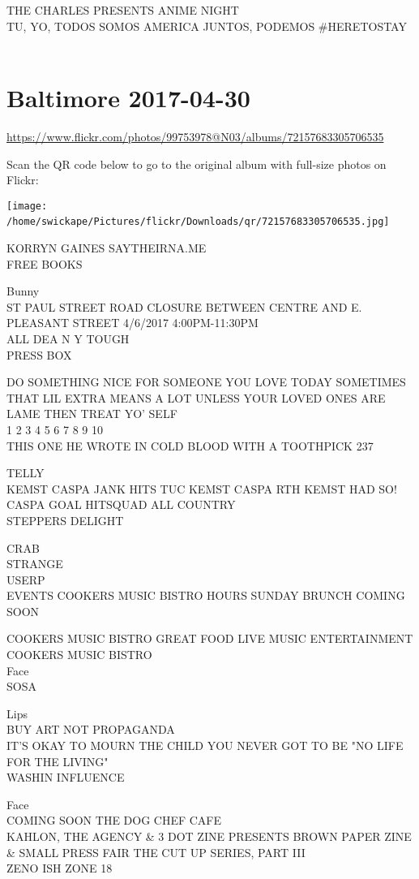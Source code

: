 \documentclass[10pt,letterpaper]{article}
\begin{document}
THE CHARLES PRESENTS ANIME NIGHT\\
TU, YO, TODOS SOMOS AMERICA JUNTOS, PODEMOS \#HERETOSTAY
\

\section*{Baltimore 2017-04-30}

\url{https://www.flickr.com/photos/99753978@N03/albums/72157683305706535}

Scan the QR code below to go to the original album with full-size photos on Flickr:

\texttt{[image: /home/swickape/Pictures/flickr/Downloads/qr/72157683305706535.jpg]}
\

KORRYN GAINES SAYTHEIRNA.ME\\
FREE BOOKS

Bunny\\
ST PAUL STREET ROAD CLOSURE BETWEEN CENTRE AND E. PLEASANT STREET 4/6/2017 4:00PM{-}11:30PM\\
ALL DEA N Y TOUGH\\
PRESS BOX

DO SOMETHING NICE FOR SOMEONE YOU LOVE TODAY SOMETIMES THAT LIL EXTRA MEANS A LOT UNLESS YOUR LOVED ONES ARE LAME THEN TREAT YO' SELF\\
1 2 3 4 5 6 7 8 9 10\\
THIS ONE HE WROTE IN COLD BLOOD WITH A TOOTHPICK 237

TELLY\\
KEMST CASPA JANK HITS TUC KEMST CASPA RTH KEMST HAD SO!  CASPA GOAL HITSQUAD ALL COUNTRY\\
STEPPERS DELIGHT

CRAB\\
STRANGE\\
USERP\\
EVENTS COOKERS MUSIC BISTRO HOURS SUNDAY BRUNCH COMING SOON

COOKERS MUSIC BISTRO GREAT FOOD LIVE MUSIC ENTERTAINMENT\\
COOKERS MUSIC BISTRO\\
Face\\
SOSA

Lips\\
BUY ART NOT PROPAGANDA\\
IT'S OKAY TO MOURN THE CHILD YOU NEVER GOT TO BE "NO LIFE FOR THE LIVING"\\
WASHIN INFLUENCE

Face\\
COMING SOON THE DOG CHEF CAFE\\
KAHLON, THE AGENCY \& 3 DOT ZINE PRESENTS BROWN PAPER ZINE \& SMALL PRESS FAIR THE CUT UP SERIES, PART III\\
ZENO ISH ZONE 18
\end{document}
